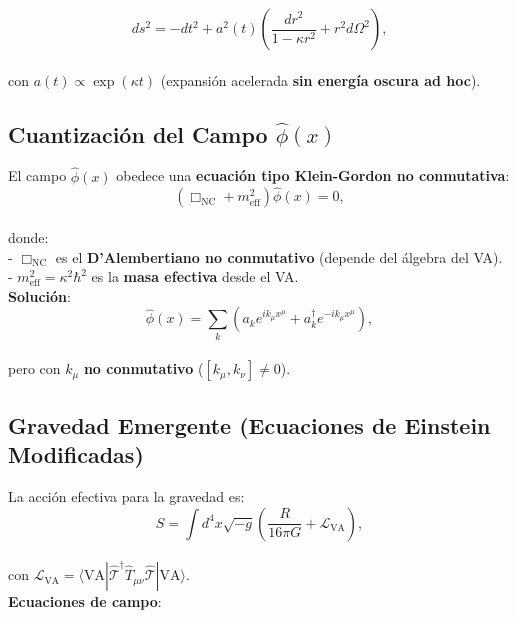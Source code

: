 \documentclass[a4paper]{article}
\theoremstyle{definition}
\theoremstyle{remark}
\numberwithin{equation}{section}
\begin{document}
	\[
	ds^2 = -dt^2 + a^2(t) \left( \frac{dr^2}{1 - \kappa r^2} + r^2 d\Omega^2 \right),
	\]\\
	
	con \(a(t) \propto \exp(\kappa t)\) (expansión acelerada \textbf{sin energía oscura ad hoc}).
	
	
	\subsection{Cuantización del Campo \(\hat{\phi}(x)\)}
	
	El campo \(\hat{\phi}(x)\) obedece una \textbf{ecuación tipo Klein-Gordon no conmutativa}:\\
	
	\[
	\left( \Box_{\text{NC}} + m^2_{\text{eff}} \right) \hat{\phi}(x) = 0,
	\]\\
	
	donde:\\
	
	- \(\Box_{\text{NC}}\) es el \textbf{D'Alembertiano no conmutativo} (depende del álgebra del VA).\\
	
	- \(m^2_{\text{eff}} = \kappa^2 \hbar^2\) es la \textbf{masa efectiva} desde el VA.\\
	
	
	\textbf{Solución}:\\
	
	\[
	\hat{\phi}(x) = \sum_k \left( a_k e^{i k_\mu x^\mu} + a_k^\dagger e^{-i k_\mu x^\mu} \right),
	\]\\
	
	pero con \(k_\mu\) \textbf{no conmutativo} (\([k_\mu, k_\nu] \neq 0\)).
	
	\subsection{Gravedad Emergente (Ecuaciones de Einstein Modificadas)}
	
	La acción efectiva para la gravedad es:\\
	
	\[
	S = \int d^4x \sqrt{-g} \left( \frac{R}{16\pi G} + \mathcal{L}_{\text{VA}} \right),
	\]\\
	
	con \(\mathcal{L}_{\text{VA}} = \langle \text{VA} | \hat{\mathcal{T}}^\dagger \hat{T}_{\mu\nu} \hat{\mathcal{T}} | \text{VA} \rangle\).\\
	
	\textbf{Ecuaciones de campo}:\\
	
\end{document}
